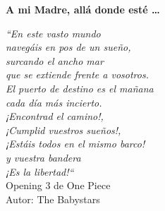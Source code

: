 % 
% 
% 
% 
% 
% 
% 
% 

% 
% 

\thispagestyle{empty}

\begin{flushright}

  \vspace*{\fill}

  \textbf{A mi Madre, allá donde esté \ldots}\\

  \vspace{3cm}

  \emph{``En este vasto mundo \\
  	navegáis en pos de un sueño,  \\
  	surcando el ancho mar  \\
  	que se extiende frente a vosotros.  \\
  	El puerto de destino es el mañana  \\
  	cada día más incierto.  \\
  	¡Encontrad el camino!,  \\
  	¡Cumplid vuestros sueños!,  \\
  	¡Estáis todos en el mismo barco!  \\
  	y vuestra bandera \\
  	¡Es la libertad!``}\\ 
    Opening 3 de One Piece \\
    Autor: The Babystars

\end{flushright}  

\vspace{4cm}
\vspace*{\fill}




